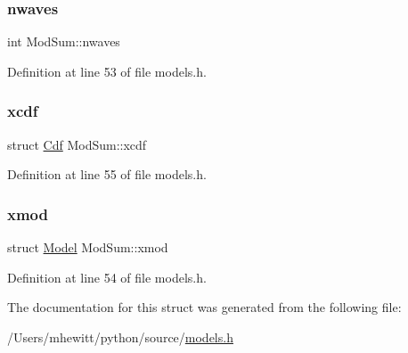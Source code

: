 \mbox{\label{struct_mod_sum_a5a51b3b8e646913e986e827121ec0ceb}} 
\subsubsection{\texorpdfstring{nwaves}{nwaves}}
{\footnotesize\ttfamily int Mod\+Sum\+::nwaves}



Definition at line 53 of file models.\+h.

\mbox{\label{struct_mod_sum_ac90994fb16680639054d38eda5c411f0}} 
\subsubsection{\texorpdfstring{xcdf}{xcdf}}
{\footnotesize\ttfamily struct \hyperlink{struct_cdf}{Cdf} Mod\+Sum\+::xcdf}



Definition at line 55 of file models.\+h.

\mbox{\label{struct_mod_sum_a64d79a8a3733c76b1f8f1d81213e974e}} 
\subsubsection{\texorpdfstring{xmod}{xmod}}
{\footnotesize\ttfamily struct \hyperlink{struct_model}{Model} Mod\+Sum\+::xmod}



Definition at line 54 of file models.\+h.



The documentation for this struct was generated from the following file\+:\begin{DoxyCompactItemize}
\item 
/\+Users/mhewitt/python/source/\hyperlink{models_8h}{models.\+h}\end{DoxyCompactItemize}
